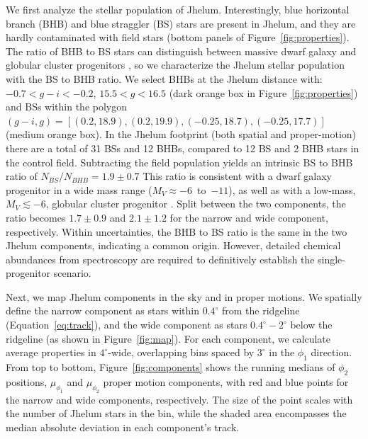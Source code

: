 \documentclass[twocolumn]{aastex62}
\newcommand{\apw}[1]{{\color{blue} APW: #1}}
\begin{document}
We first analyze the stellar population of Jhelum.
Interestingly, blue horizontal branch (BHB) and blue straggler (BS) stars are present in Jhelum, and they are hardly contaminated with field stars (bottom panels of Figure~\ref{fig:properties}).
The ratio of BHB to BS stars can distinguish between massive dwarf galaxy and globular cluster progenitors \citep[e.g.,][]{momany2007, deason2015}, so we characterize the Jhelum stellar population with the BS to BHB ratio.
We select BHBs at the Jhelum distance with: $-0.7<g-i<-0.2$, $15.5<g<16.5$ (dark orange box in Figure~\ref{fig:properties}) and BSs within the polygon $(g-i,g) = [(0.2,18.9), (0.2, 19.9), (-0.25, 18.7), (-0.25,17.7)]$ (medium orange box).
In the Jhelum footprint (both spatial and proper-motion) there are a total of 31 BSs and 12 BHBs, compared to 12 BS and 2 BHB stars in the control field.
Subtracting the field population yields an intrinsic BS to BHB ratio of $N_{BS} / N_{BHB} = 1.9\pm 0.7$
This ratio is consistent with a dwarf galaxy progenitor in a wide mass range ($M_V\approx-6$~to~$-11$), as well as with a low-mass, $M_V\lesssim-6$, globular cluster progenitor \citep{deason2015}.
Split between the two components, the ratio becomes $1.7\pm0.9$ and $2.1\pm1.2$ for the narrow and wide component, respectively.
Within uncertainties, the BHB to BS ratio is the same in the two Jhelum components, indicating a common origin.
However, detailed chemical abundances from spectroscopy are required to definitively establish the single-progenitor scenario.

Next, we map Jhelum components in the sky and in proper motions.
We spatially define the narrow component as stars within $0.4^\circ$ from the ridgeline (Equation~\ref{eq:track}), and the wide component as stars $0.4^\circ-2^\circ$ below the ridgeline (as shown in Figure~\ref{fig:map}).
For each component, we calculate average properties in $4^\circ$-wide, overlapping bins spaced by $3^\circ$ in the $\phi_1$ direction.
From top to bottom, Figure~\ref{fig:components} shows the running medians of $\phi_2$ positions, $\mu_{\phi_1}$ and $\mu_{\phi_2}$ proper motion components, with red and blue points for the narrow and wide components, respectively.
The size of the point scales with the number of Jhelum stars in the bin, while the shaded area encompasses the median absolute deviation in each component's track.
\end{document}
